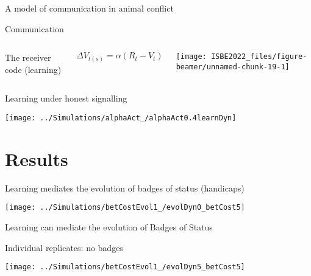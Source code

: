 \documentclass[
  ignorenonframetext,
]{beamer}
\begin{document}
\begin{frame}{A model of communication in animal conflict}
\begin{block}{Communication}
\begin{columns}[T]

The receiver code (learning)

\tiny
\begin{equation*}
  \Delta V_{t(s)}=\alpha (R_t-V_t)
\end{equation*}



\begin{center}\texttt{[image: ISBE2022\_files/figure-beamer/unnamed-chunk-19-1]} \end{center}

\end{columns}
\end{block}
\end{frame}

\begin{frame}{Learning under honest signalling}
\protect\hypertarget{learning-under-honest-signalling}{}
\begin{center}\texttt{[image: ../Simulations/alphaAct\_/alphaAct0.4learnDyn]} \end{center}
\end{frame}

\hypertarget{results}{%
\section{Results}\label{results}}

\begin{frame}{Learning mediates the evolution of badges of status
(handicaps)}
\protect\hypertarget{learning-mediates-the-evolution-of-badges-of-status-handicaps}{}
\begin{center}\texttt{[image: ../Simulations/betCostEvol1\_/evolDyn0\_betCost5]} \end{center}
\end{frame}

\begin{frame}{Learning can mediate the evolution of Badges of Status}
\protect\hypertarget{learning-can-mediate-the-evolution-of-badges-of-status}{}
\begin{block}{Individual replicates: no badges}
\protect\hypertarget{individual-replicates-no-badges}{}
\begin{center}\texttt{[image: ../Simulations/betCostEvol1\_/evolDyn5\_betCost5]} \end{center}
\end{block}
\end{frame}
\end{document}
